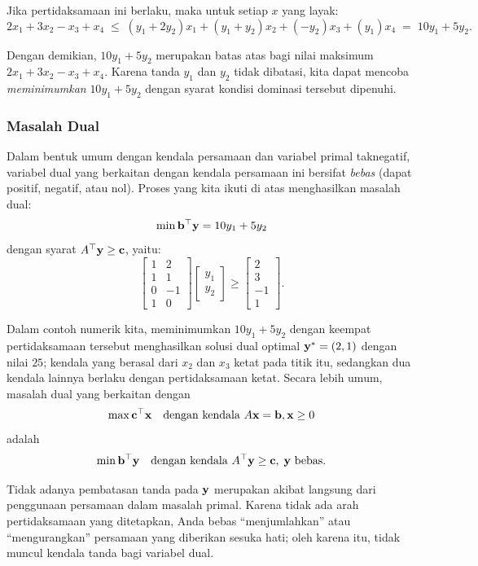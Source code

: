 Jika pertidaksamaan ini berlaku, maka untuk setiap $x$ yang layak:
\[
2x_1 + 3x_2 - x_3 + x_4 \;\leq\; (y_1+2y_2)x_1 + (y_1+y_2)x_2 + (-y_2)x_3 + (y_1)x_4 \;=\; 10y_1 + 5y_2.
\]

Dengan demikian, $10y_1 + 5y_2$ merupakan batas atas bagi nilai maksimum $2x_1 + 3x_2 - x_3 + x_4$. Karena tanda $y_1$ dan $y_2$ tidak dibatasi, kita dapat mencoba \emph{meminimumkan} $10y_1 + 5y_2$ dengan syarat kondisi dominasi tersebut dipenuhi.

\subsubsection*{Masalah Dual}

Dalam bentuk umum dengan kendala persamaan dan variabel primal taknegatif, variabel dual yang berkaitan dengan kendala persamaan ini bersifat \emph{bebas} (dapat positif, negatif, atau nol). Proses yang kita ikuti di atas menghasilkan masalah dual:
\[
\min \mathbf{b}^\top \mathbf{y} = 10y_1 + 5y_2
\]
dengan syarat $A^\top \mathbf{y} \geq \mathbf{c}$, yaitu:
\[
\begin{bmatrix}
1 & 2 \\
1 & 1 \\
0 & -1 \\
1 & 0
\end{bmatrix}
\begin{bmatrix}y_1 \\ y_2\end{bmatrix}
\geq
\begin{bmatrix}2 \\ 3 \\ -1 \\ 1\end{bmatrix}.
\]

Dalam contoh numerik kita, meminimumkan $10y_1 + 5y_2$ dengan keempat pertidaksamaan tersebut menghasilkan solusi dual optimal $\mathbf{y}^* = (2, 1)$ dengan nilai $25$; kendala yang berasal dari $x_2$ dan $x_3$ ketat pada titik itu, sedangkan dua kendala lainnya berlaku dengan pertidaksamaan ketat. Secara lebih umum, masalah dual yang berkaitan dengan
\[
\max \mathbf{c}^\top \mathbf{x} \quad\mbox{dengan kendala } A \mathbf{x} = \mathbf{b}, \mathbf{x} \geq 0
\]
adalah
\[
\min \mathbf{b}^\top \mathbf{y} \quad \mbox{dengan kendala } A^\top \mathbf{y} \geq \mathbf{c},\; \mathbf{y} \mbox{ bebas}.
\]

Tidak adanya pembatasan tanda pada $\mathbf{y}$ merupakan akibat langsung dari penggunaan persamaan dalam masalah primal. Karena tidak ada arah pertidaksamaan yang ditetapkan, Anda bebas ``menjumlahkan'' atau ``mengurangkan'' persamaan yang diberikan sesuka hati; oleh karena itu, tidak muncul kendala tanda bagi variabel dual.

